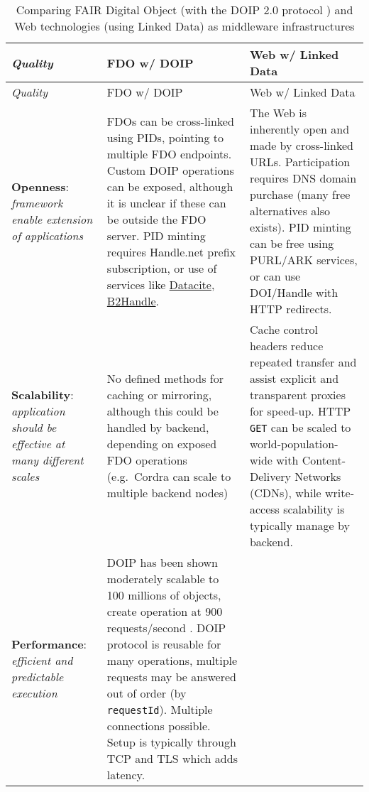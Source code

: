 \begin{landscape}
\begin{small}
\begin{longtable}[]{@{}
  >{\raggedright\arraybackslash}p{}
  >{\raggedright\arraybackslash}p{}
  >{\raggedright\arraybackslash}p{}@{}}
	\caption[Comparing FAIR Digital Object and Web technologies as middleware infrastructures]{Comparing FAIR Digital Object (with the DOIP 2.0 protocol \cite{13TcbsZF6}) and Web technologies (using Linked Data) as middleware infrastructures \cite{hRzcHhPD}
\label{tbl:fdo-web-middleware}}\tabularnewline
\toprule
\emph{Quality} & 
FDO w/ DOIP & 
Web w/ Linked Data \\
\midrule
\endfirsthead
\toprule
\emph{Quality} & 
FDO w/ DOIP & 
Web w/ Linked Data \\
\midrule
\endhead
\textbf{Openness}: \emph{framework enable extension of applications}
  & FDOs can be cross-linked using PIDs, pointing to multiple FDO endpoints. Custom DOIP operations can be exposed, although it is unclear if these can be outside the FDO server. PID minting requires Handle.net prefix subscription, or use of services like \href{https://datacite.org/}{Datacite}, \href{https://eudat.eu/services/userdoc/b2handle}{B2Handle}.
  & The Web is inherently open and made by cross-linked URLs. Participation requires DNS domain purchase (many free alternatives also exists). PID minting can be free using PURL/ARK services, or can use DOI/Handle with HTTP redirects. \\
\textbf{Scalability}: \emph{application should be effective at many different scales}
  & No defined methods for caching or mirroring, although this could be handled by backend, depending on exposed FDO operations (e.g.~Cordra can scale to multiple backend nodes)
  & Cache control headers reduce repeated transfer and assist explicit and transparent proxies for speed-up. HTTP \texttt{GET} can be scaled to world-population-wide with Content-Delivery Networks (CDNs), while write-access scalability is typically manage by backend. \\
\textbf{Performance}: \emph{efficient and predictable execution}
  & DOIP has been shown moderately scalable to 100 millions of objects, create operation at 900 requests/second . DOIP protocol is reusable for many operations, multiple requests may be answered out of order (by \texttt{requestId}). Multiple connections possible. Setup is typically through TCP and TLS which adds latency.

\end{longtable}
\end{small}
\end{landscape}
